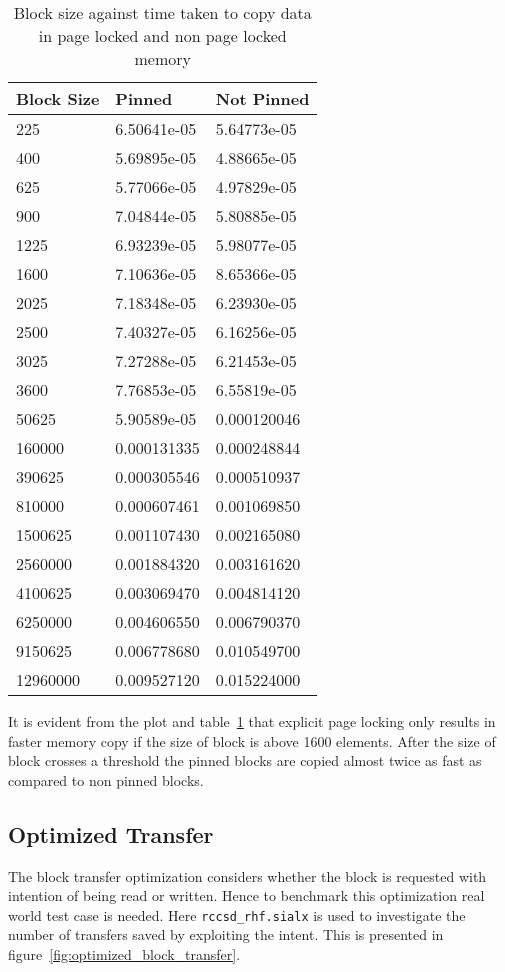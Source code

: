 \begin{table}[h]
  \centering
  \begin{tabular}{l | l | l}
    \hline
    Block Size & Pinned      & Not Pinned  \\
    \hline
    225        & 6.50641e-05 & 5.64773e-05 \\
    400        & 5.69895e-05 & 4.88665e-05 \\
    625        & 5.77066e-05 & 4.97829e-05 \\
    900        & 7.04844e-05 & 5.80885e-05 \\
    1225       & 6.93239e-05 & 5.98077e-05 \\
    1600       & 7.10636e-05 & 8.65366e-05 \\
    2025       & 7.18348e-05 & 6.23930e-05 \\
    2500       & 7.40327e-05 & 6.16256e-05 \\
    3025       & 7.27288e-05 & 6.21453e-05 \\
    3600       & 7.76853e-05 & 6.55819e-05 \\
    50625      & 5.90589e-05 & 0.000120046 \\
    160000     & 0.000131335 & 0.000248844 \\
    390625     & 0.000305546 & 0.000510937 \\
    810000     & 0.000607461 & 0.001069850 \\
    1500625    & 0.001107430 & 0.002165080 \\
    2560000    & 0.001884320 & 0.003161620 \\
    4100625    & 0.003069470 & 0.004814120 \\
    6250000    & 0.004606550 & 0.006790370 \\
    9150625    & 0.006778680 & 0.010549700 \\
    12960000   & 0.009527120 & 0.015224000 \\
    \hline
  \end{tabular}
  \caption{Block size against time taken to copy data in page locked and non page locked memory}
  \label{tab:mempin_block_copy}
\end{table}

It is evident from the plot and table~\ref{tab:mempin_block_copy} that explicit
page locking only results in faster memory copy if the size of block is above
1600 elements. After the size of block crosses a threshold the pinned blocks are
copied almost twice as fast as compared to non pinned blocks.

\subsection{Optimized Transfer}
The block transfer optimization considers whether the block is requested with
intention of being read or written. Hence to benchmark this optimization real world
test case is needed. Here \texttt{rccsd\_rhf.sialx} is used to investigate the
number of transfers saved by exploiting the intent. This is presented in
figure~\ref{fig:optimized_block_transfer}.

